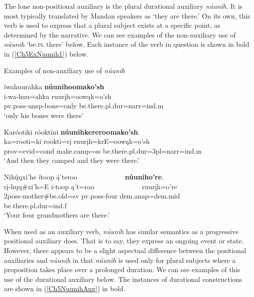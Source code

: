 The lone non-positional auxiliary is the plural durational auxiliary \textit{núunih}. It is most typically translated by Mandan speakers as `they are there.' On its own, this verb is used to express that a plural subject exists at a specific point, as determined by the narrative. We can see examples of the non-auxiliary use of \textit{núunih} `be.\textsc{pl} there' below. Each instance of the verb in question is shown in bold in (\ref{Ch5ExNuunih1}) below.

\begin{exe}
    \item\label{Ch5ExNuunih1} Examples of non-auxiliary use of \textit{núunih}

    \begin{xlist}
        \item\label{Ch5ExNuunih1A} \glll íwahuurahka \textbf{núunihoomako'sh}\\
        i-wa-huu=ahka ruurįh=oowąk=o'sh\\
        pv.poss-unsp-\textnormal{bone}=\textnormal{only} \textnormal{be.there}.pl.dur=narr=ind.m\\
        \glt `only his bones were there' \citep[199]{hollow1973b}

        \item\label{Ch5ExNuunih1B} \glll Karóotiki róoktini \textbf{núunihkereroomako'sh}.\\
        ka=rooti=ki rookti=rį ruurįh=krE=oowąk=o'sh\\ prov=evid=cond \textnormal{make.camp}=ss \textnormal{be.there}.pl.dur=3pl=narr=ind.m\\
        \glt `And then they camped and they were there.' \citep[171]{hollow1973b}

        \item\label{Ch5ExNuunih1C} \glll Nihų́ųxi'he ítoop ą́'teroo ~ ~ ~ ~ ~ ~ ~ ~ \textbf{núuniho're}.\\
        rį-hųų\#xi'h=E i-toop ą't=roo ~ ~ ~ ~ ~ ~ ~ ~ ruurįh=o're\\
        2poss-\textnormal{mother}\#\textnormal{be.old}=sv pv.poss-\textnormal{four} dem.anap=dem.mid ~ ~ ~ ~ ~ ~ ~ ~ \textnormal{be.there}.pl.dur=ind.f\\
        \glt `Your four grandmothers are there.' \citep[104]{hollow1973a}

    \end{xlist}
\end{exe}

When used as an auxiliary verb, \textit{núunih} has similar semantics as a progressive positional auxiliary does. That is to say, they express an ongoing event or state. However, there appears to be a slight aspectual difference between the positional auxiliaries and \textit{núunih} in that \textit{núunih} is used only for plural subjects where a proposition takes place over a prolonged duration. We can see examples of this use of the durational auxiliary below. The instances of durational constructions are shown in (\ref{Ch5NuunihAux}) in bold.

